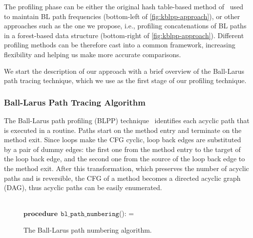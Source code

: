 The profiling phase can be either the original hash table-based method of~\cite{Ball96} used to maintain BL path frequencies
(bottom-left of \myfigure\ref{fig:kblpp-approach}), or other approaches such as the one we propose, i.e., profiling concatenations of BL paths in a forest-based data structure (bottom-right of \myfigure\ref{fig:kblpp-approach}). Different profiling methods can be therefore cast into a common framework, increasing flexibility and helping us make more accurate comparisons.

We start the description of our approach with a brief overview of the Ball-Larus path tracing technique, which we use as the first stage of our profiling technique.

\subsubsection*{Ball-Larus Path Tracing Algorithm}

The Ball-Larus path profiling (BLPP) technique~\cite{Ball96} identifies each acyclic path that is executed in a routine. Paths start on the method entry and terminate on the method exit. Since loops make the CFG cyclic, loop back edges are substituted by a pair of dummy edges: the first one from the method entry to the target of the loop back edge, and the second one from the source of the loop back edge to the method exit. After this transformation, which preserves the number of acyclic paths and is reversible, the CFG of a method becomes a directed acyclic graph (DAG), thus acyclic paths can be easily enumerated.

\ifdefined\noauthorea
\begin{figure}[h!]
\IncMargin{2em}
\begin{algorithm}[H]
\DontPrintSemicolon
\LinesNumbered
\SetAlgoNoLine
\SetNlSkip{1em} 
\Indm\Indmm
\hrulefill\\
$\mathbf{procedure} \> \> \texttt{bl\_path\_numbering}$():\;
\vspace{1mm}
\everypar={\nl}
\Indp\Indpp
{}
\vspace{-2mm}
\Indm\Indmm
\nonl\hrulefill\vspace{1mm}\\
\DecMargin{5em}
\caption{\label{alg:kblpp-bl-numbering} The Ball-Larus path numbering algorithm.}
\IncMargin{3em}
\end{algorithm}
\end{figure}

